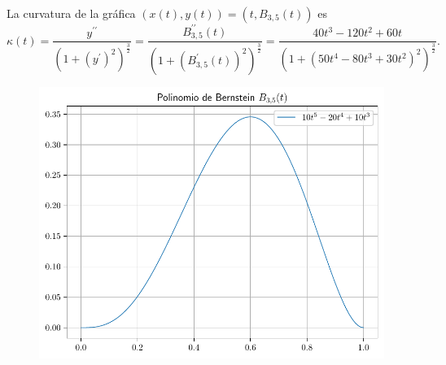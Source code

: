 
\begin{frame}
    \begin{solution}
        La curvatura de la gráfica
        \begin{math}
            \left(
            x\left(t\right),
            y\left(t\right)
            \right)=
            \left(
            t,
            B_{3,5}\left(t\right)
            \right)
        \end{math}
        es
        \begin{equation*}
            \kappa\left(t\right)=
            \dfrac{
                y^{\prime\prime}
            }{
                {\left(1+{\left(y^{\prime}\right)}^{2}\right)}^{\frac{3}{2}}
            }=
            \dfrac{
                B^{\prime\prime}_{3,5}\left(t\right)
            }{
                {\left(1+{\left(B^{\prime}_{3,5}\left(t\right)\right)}^{2}\right)}^{\frac{3}{2}}
            }=
            \dfrac{
            40t^{3}-120t^{2}+60t
            }{
            {\left(1+{\left(50t^{4}-80t^{3}+30t^{2}\right)}^{2}\right)}^{\frac{3}{2}}
            }.
        \end{equation*}
    \end{solution}
\end{frame}

\begin{frame}
    \begin{solution}
        \begin{figure}[ht!]
            \centering
            \includegraphics[width=.72\paperwidth]{p1}
        \end{figure}
    \end{solution}
\end{frame}

